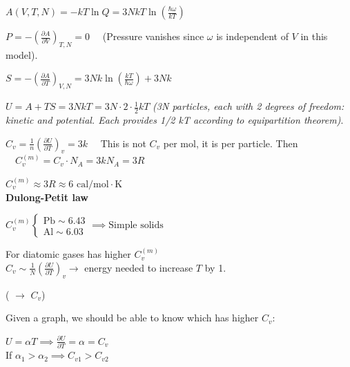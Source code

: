 \documentclass[12pt,a4paper]{report}
\newcommand{\esp}{\vspace{0.5cm}}
\begin{document}
	\esp
	
	$A(V, T, N) = -kT \ln Q = 3N kT \ln \left( \frac{\hbar \omega}{kT} \right)$
	
	\esp
	
	$P = -\left( \frac{\partial A}{\partial V} \right)_{T, N} = 0 \quad$ (Pressure vanishes since $\omega$ is independent of $V$ in this model).
	
	\esp
	
	$S = -\left( \frac{\partial A}{\partial T} \right)_{V, N} = 3N k \ln \left( \frac{kT}{\hbar \omega} \right) + 3N k$
	
	\esp
	
	$U = A + TS = 3N kT = 3N \cdot 2 \cdot \frac{1}{2} kT$
	\textit{(3N particles, each with 2 degrees of freedom: kinetic and potential. Each provides 1/2 kT according to equipartition theorem)}.
	
	\esp
	
	$C_v = \frac{1}{n} \left( \frac{\partial U}{\partial T} \right)_v = 3k \quad$ This is not $C_v$ per mol, it is per particle.
	Then $\quad C_v^{(m)} = C_v \cdot N_A = 3 k N_A = 3R$
	
	\esp
	
	$C_v^{(m)} \approx 3R \approx 6 \text{ cal/mol}\cdot\text{K}$ \\
	\textbf{Dulong-Petit law}
	
	\esp
	
	$C_v^{(m)} \begin{cases} \text{Pb} \sim 6.43 \\ \text{Al} \sim 6.03 \end{cases} \implies \text{Simple solids}$
	
	\esp
	
	For diatomic gases has higher $C_v^{(m)}$ \\
	$C_v \sim \frac{1}{N} \left( \frac{\partial U}{\partial T} \right)_v \to$ energy needed to increase $T$ by 1. 
	
	\esp
	
	\noindent ( $\to$  $C_v$)
	
	\esp
	
	Given a graph, we should be able to know which has higher $C_v$:
	
	\esp
	
	
	\esp
	
	$U = \alpha T \implies \frac{\partial U}{\partial T} = \alpha = C_v$ \\
	If $\alpha_1 > \alpha_2 \implies C_{v1} > C_{v2}$
	
\end{document}
